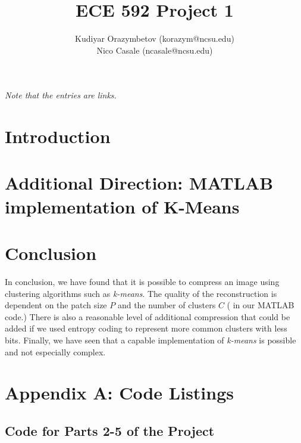 \documentclass[]{ncmathy}
\begin{document}
\title{ECE 592 Project 1}
\author{Kudiyar Orazymbetov (korazym@ncsu.edu)\\Nico Casale (ncasale@ncsu.edu)}
\makeTitlePage

\textit{Note that the entries are links.}
\tableofcontents
\listoftables
\listoffigures
\lstlistoflistings

\pagebreak

\section{Introduction}
	
	
	


\section{Additional Direction: MATLAB implementation of K-Means}

	

\section{Conclusion}
	In conclusion, we have found that it is possible to compress an image using clustering algorithms such as \textit{k-means}. The quality of the reconstruction is dependent on the patch size $P$ and the number of clusters $C$ ( in our MATLAB code.) There is also a reasonable level of additional compression that could be added if we used entropy coding to represent more common clusters with less bits. Finally, we have seen that a capable implementation of \textit{k-means} is possible and not especially complex.

\pagebreak

\section{Appendix A: Code Listings}
	
	\subsection{Code for Parts 2-5 of the Project}
		\subsubsection{}
			
\end{document}
